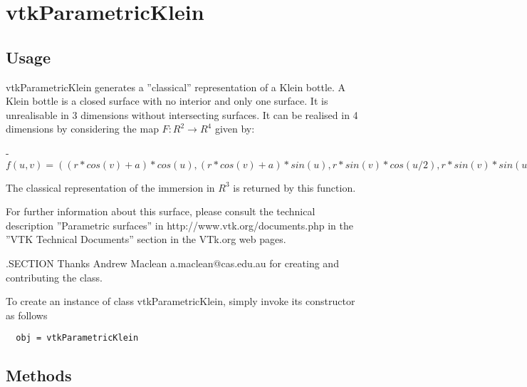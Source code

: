 \section{vtkParametricKlein}

\subsection{Usage}

 vtkParametricKlein generates a ''classical'' representation of a Klein
 bottle.  A Klein bottle is a closed surface with no interior and only one
 surface.  It is unrealisable in 3 dimensions without intersecting
 surfaces.  It can be
 realised in 4 dimensions by considering the map $F:R^2 \rightarrow R^4$  given by:

 - $f(u,v) = ((r*cos(v)+a)*cos(u),(r*cos(v)+a)*sin(u),r*sin(v)*cos(u/2),r*sin(v)*sin(u/2))$

 The classical representation of the immersion in $R^3$ is returned by this function.


 For further information about this surface, please consult the 
 technical description ''Parametric surfaces'' in http://www.vtk.org/documents.php 
 in the ''VTK Technical Documents'' section in the VTk.org web pages.

 .SECTION Thanks
 Andrew Maclean a.maclean@cas.edu.au for creating and contributing the
 class.


To create an instance of class vtkParametricKlein, simply
invoke its constructor as follows
\begin{verbatim}
  obj = vtkParametricKlein
\end{verbatim}
\subsection{Methods}

